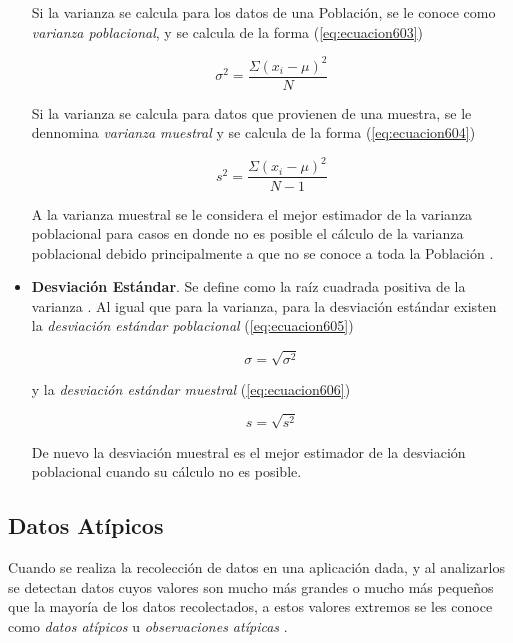\begin{itemize}
	Si la varianza se calcula para los datos de una Población, se le conoce como \textit{varianza poblacional}, y se calcula de la forma (\ref{eq:ecuacion603})

	\begin{equation}
		\sigma^2=\frac{\Sigma (x_i - \mu)^2 }{N}
		\label{eq:ecuacion603}
	\end{equation}

	Si la varianza se calcula para datos que provienen de una muestra, se le dennomina \textit{varianza muestral} y se calcula de la forma (\ref{eq:ecuacion604})

	\begin{equation}
		s^2=\frac{\Sigma (x_i - \mu)^2 }{N-1}
		\label{eq:ecuacion604}
	\end{equation}

	A la varianza muestral se le considera el mejor estimador de la varianza poblacional para casos en donde no es posible el cálculo de la varianza poblacional debido principalmente a que no se conoce a toda la Población \cite{anderson}.

	\item \textbf{Desviación Estándar}. Se define como la raíz cuadrada positiva de la varianza \cite{anderson}. Al igual que para la varianza, para la desviación estándar existen la \textit{desviación estándar poblacional} (\ref{eq:ecuacion605})
	
	\begin{equation}
		\sigma=\sqrt{\sigma^2}
		\label{eq:ecuacion605}
	\end{equation}

	y la \textit{desviación estándar muestral} (\ref{eq:ecuacion606})

	\begin{equation}
		s=\sqrt{s^2}
		\label{eq:ecuacion606}
	\end{equation}

	De nuevo la desviación muestral es el mejor estimador de la desviación poblacional cuando su cálculo no es posible.

\end{itemize}

\subsection{Datos Atípicos}

Cuando se realiza la recolección de datos en una aplicación dada, y al analizarlos se detectan datos cuyos valores son mucho más grandes o mucho más pequeños que la mayoría de los datos recolectados, a estos valores extremos 
se les conoce como \textit{datos atípicos} u \textit{observaciones atípicas} \cite{anderson}.


